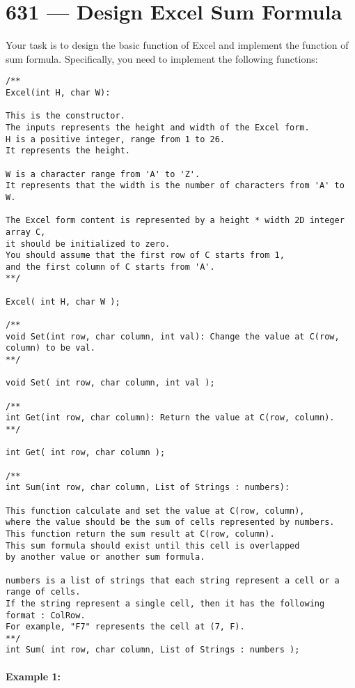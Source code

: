 \section{631 --- Design Excel Sum Formula}
Your task is to design the basic function of Excel and implement the function of sum formula. Specifically, you need to implement the following functions:

\begin{lstlisting}[style=customc]
/**
Excel(int H, char W):

This is the constructor.
The inputs represents the height and width of the Excel form.
H is a positive integer, range from 1 to 26.
It represents the height.

W is a character range from 'A' to 'Z'.
It represents that the width is the number of characters from 'A' to W.

The Excel form content is represented by a height * width 2D integer array C,
it should be initialized to zero.
You should assume that the first row of C starts from 1,
and the first column of C starts from 'A'.
**/

Excel( int H, char W );

/**
void Set(int row, char column, int val): Change the value at C(row, column) to be val.
**/

void Set( int row, char column, int val );

/**
int Get(int row, char column): Return the value at C(row, column).
**/

int Get( int row, char column );

/**
int Sum(int row, char column, List of Strings : numbers):

This function calculate and set the value at C(row, column),
where the value should be the sum of cells represented by numbers.
This function return the sum result at C(row, column).
This sum formula should exist until this cell is overlapped
by another value or another sum formula.

numbers is a list of strings that each string represent a cell or a range of cells.
If the string represent a single cell, then it has the following format : ColRow.
For example, "F7" represents the cell at (7, F).
**/
int Sum( int row, char column, List of Strings : numbers );
\end{lstlisting}



\paragraph{Example 1:}

